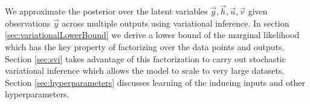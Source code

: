 %
%
We approximate the posterior over the latent variables $\vec{g}, \vec{h}, \vec{u}, \vec{v}$ given observations $\vec{y}$ across
multiple outputs using variational inference.
In section \ref{sec:variationalLowerBound} we derive a lower bound of the marginal likelihood which has the key property of factorizing over the data points and outputs. Section \ref{sec:svi}  takes advantage of this factorization to 
carry out stochastic variational inference which allows the model to scale to very large datasets.
Section \ref{sec:hyperparameters} discusses learning of the inducing inputs and other hyperparameters.


